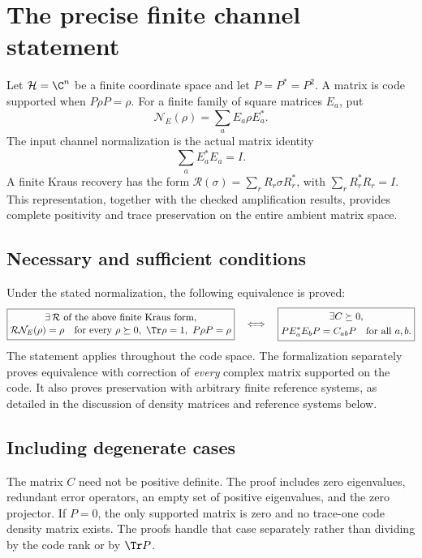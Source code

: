 \section{The precise finite channel statement}\label{supp5:section:001}
Let $\mathcal H=\C^n$ be a finite coordinate space and let $P=P^*=P^2$. A matrix is code supported when $P\rho P=\rho$. For a finite family of square matrices $E_a$, put
\[
\mathcal N_E(\rho)=\sum_a E_a\rho E_a^*.
\]
The input channel normalization is the actual matrix identity
\[
\sum_a E_a^*E_a=I.
\]
A finite Kraus recovery has the form $\mathcal R(\sigma)=\sum_r R_r\sigma R_r^*$, with $\sum_rR_r^*R_r=I$. This representation, together with the checked amplification results, provides complete positivity and trace preservation on the entire ambient matrix space.

\subsection{Necessary and sufficient conditions}
Under the stated normalization, the following equivalence is proved:
\[
\boxed{\begin{gathered}
\exists\,\mathcal R\text{ of the above finite Kraus form,}\\[-2pt]
\mathcal R\mathcal N_E(\rho)=\rho
\quad\text{for every }\rho\succeq0,\ \Tr\rho=1,\ P\rho P=\rho
\end{gathered}}
\quad\Longleftrightarrow\quad
\boxed{\begin{gathered}
\exists C\succeq0,\\
PE_a^*E_bP=C_{ab}P\quad\text{for all }a,b.
\end{gathered}}
\]
The statement applies throughout the code space. The formalization separately proves equivalence with correction of \emph{every} complex matrix supported on the code. It also proves preservation with arbitrary finite reference systems, as detailed in the discussion of density matrices and reference systems below.



\subsection{Including degenerate cases}
The matrix $C$ need not be positive definite. The proof includes zero eigenvalues, redundant error operators, an empty set of positive eigenvalues, and the zero projector. If $P=0$, the only supported matrix is zero and no trace-one code density matrix exists. The proofs handle that case separately rather than dividing by the code rank or by $\Tr P$.

